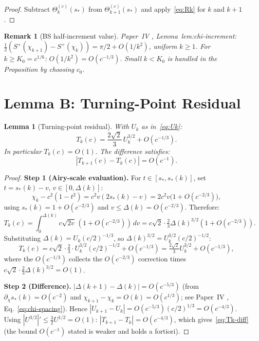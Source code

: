 \documentclass[12pt]{amsart}
\newtheorem{lemma}[theorem]{Lemma}
\newtheorem{remark}[theorem]{Remark}
\begin{document}
\begin{proof}
Subtract $\Theta_k^{(c)}(s_*)$ from $\Theta_{k+1}^{(c)}(s_*)$
and apply~\eqref{eq:Rk} for $k$ and $k+1$.
\end{proof}

\begin{remark}[BS half-increment value]\label{rem:BS}
Paper~IV \cite{paperIV}, Lemma~lem:chi-increment:
$\frac12(S^+(\chi_{k+1}) - S^+(\chi_k)) = \pi/2 + O(1/k^2)$,
uniform $k \ge 1$.
For $k \ge K_0 = c^{1/6}$: $O(1/k^2) = O(c^{-1/3})$.
Small $k < K_0$ is handled in the Proposition by choosing $c_0$.
\end{remark}

\section{Lemma B: Turning-Point Residual}
\label{sec:lemmaB}

\begin{lemma}[Turning-point residual]
\label{lem:B}
With $U_k$ as in~\eqref{eq:Uk}:
\begin{equation}\label{eq:Tk-value}
  T_k(c) = \frac{2\sqrt{2}}{3}\,U_k^{3/2} + O(c^{-1/3}).
\end{equation}
In particular $T_k(c) = O(1)$.
The difference satisfies:
\begin{equation}\label{eq:Tk-diff}
  |T_{k+1}(c) - T_k(c)| = O(c^{-1}).
\end{equation}
\end{lemma}

\begin{proof}
\textbf{Step 1 (Airy-scale evaluation).}
For $t \in [s_*, s_*(k)]$, set $t = s_*(k) - v$,
$v \in [0, \Delta(k)]$:
\[
  \chi_k - c^2(1-t^2)
  = c^2 v(2s_*(k) - v)
  = 2c^2 v \bigl(1 + O(c^{-2/3})\bigr),
\]
using $s_*(k) = 1 + O(c^{-2/3})$ and $v \le \Delta(k) = O(c^{-2/3})$.
Therefore:
\[
  T_k(c)
  = \int_0^{\Delta(k)} c\sqrt{2v}\,(1+O(c^{-2/3}))\,dv
  = c\sqrt{2}\cdot\tfrac{2}{3}\Delta(k)^{3/2}(1+O(c^{-2/3})).
\]
Substituting $\Delta(k) = U_k(c/2)^{-1/3}$,
so $\Delta(k)^{3/2} = U_k^{3/2}(c/2)^{-1/2}$:
\[
  T_k(c)
  = c\sqrt{2}\cdot\tfrac{2}{3}\cdot U_k^{3/2}(c/2)^{-1/2}
    + O(c^{-1/3})
  = \tfrac{2\sqrt{2}}{3}U_k^{3/2} + O(c^{-1/3}),
\]
where the $O(c^{-1/3})$ collects the $O(c^{-2/3})$ correction
times $c\sqrt{2}\cdot\tfrac{2}{3}\Delta(k)^{3/2} = O(1)$.

\textbf{Step 2 (Difference).}
$|\Delta(k+1) - \Delta(k)| = O(c^{-5/3})$
(from $\partial_\chi s_*(k) = O(c^{-2})$ and
$\chi_{k+1} - \chi_k = O(k) = O(c^{1/3})$;
see Paper~IV \cite{paperIV}, Eq.~\eqref{eq:chi-spacing}).
Hence $|U_{k+1} - U_k| = O(c^{-5/3})(c/2)^{1/3} = O(c^{-4/3})$.
Using $|U^{3/2}|' \le \tfrac32 U^{1/2} = O(1)$:
$|T_{k+1} - T_k| = O(c^{-4/3})$,
which gives~\eqref{eq:Tk-diff} (the bound $O(c^{-1})$ stated
is weaker and holds a fortiori).
\end{proof}
\end{document}
